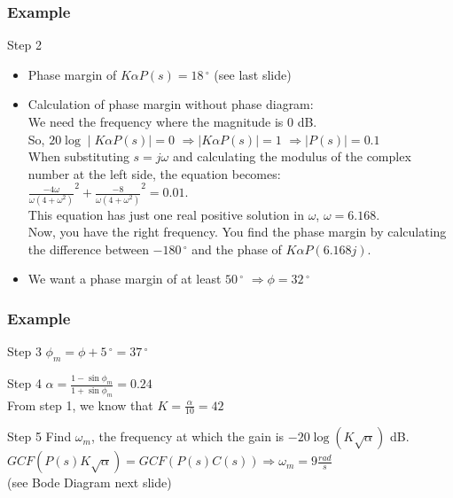 \begin{frame}
\frametitle{Example}
\begin{block}{Step 2}
	\begin{itemize}
\item Phase margin of $K\alpha P(s) = 18\,^{\circ}$ (see last slide) \\
\item Calculation of phase margin without phase diagram: \\
We need the frequency where the magnitude is 0 dB. \\So, $20\log \mid K\alpha P(s) \mid = 0$
$\Rightarrow \mid K\alpha P(s) \mid = 1$
$\Rightarrow \mid P(s) \mid = 0.1$ \\
When substituting $s = j\omega$ and calculating the modulus of the complex number at the left side, the equation becomes: \\
$\frac{-4\omega}{\omega (4 + \omega^2)}^2 + \frac{-8}{\omega (4 + \omega^2)}^2 = 0.01$. \\
This equation has just one real positive solution in $\omega$, $\omega = 6.168$.\\
Now, you have the right frequency. You find the phase margin by calculating the difference between $-180\,^{\circ}$ and the phase of $K\alpha P(6.168j)$.\\ 
\item We want a phase margin of at least $50\,^{\circ}$
$\Rightarrow \phi = 32\,^{\circ}$
\end{itemize}
\end{block}
\end{frame}

\begin{frame}
	\frametitle{Example}
\begin{block}{Step 3}
	$\phi_m = \phi + 5\,^{\circ} = 37\,^{\circ}$
\end{block}
	\begin{block}{Step 4}
		$\alpha = \frac{1 - \sin \phi_m}{1 + \sin \phi_m} = 0.24$ \\
		From step 1, we know that $K = \frac{\alpha}{10} = 42$
	\end{block}
	\begin{block}{Step 5}
		Find $\omega_m$, the frequency at which the gain is $-20\log(K\sqrt{\alpha})$ dB. 
		$GCF(P(s)K\sqrt{\alpha}) = GCF(P(s)C(s)) \Rightarrow \omega_m = 9 \frac{rad}{s}$ \\
		(see Bode Diagram next slide)
	\end{block}
\end{frame}

